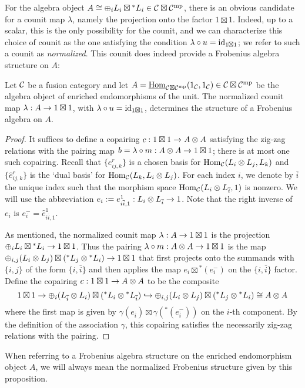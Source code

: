 \documentclass{amsart}
\begin{document}
For the algebra object $A \cong \oplus_i L_i \boxtimes {}^* L_i \in \mathcal C \boxtimes \mathcal C^{\mathrm{mp}}$, there is an obvious candidate for a counit map $\lambda$, namely the projection onto the factor $1 \boxtimes 1$.  Indeed, up to a scalar, this is the only possibility for the counit, and we can characterize this choice of counit as the one satisfying the condition $\lambda \circ u = \mathrm{id}_{1 \boxtimes 1}$; we refer to such a counit as \emph{normalized}.  This counit does indeed provide a Frobenius algebra structure on $A$:
\begin{proposition}
Let $\mathcal C$ be a fusion category and let $A = \operatorname{\underline{Hom}}_{\mathcal C \boxtimes \mathcal C^{\mathrm{mp}}}(1_\mathcal C,1_\mathcal C) \in \mathcal C \boxtimes \mathcal C^{\mathrm{mp}}$ be the algebra object of enriched endomorphisms of the unit.  The normalized counit map $\lambda: A \rightarrow 1 \boxtimes 1$, with $\lambda \circ u = \mathrm{id}_{1 \boxtimes 1}$, determines the structure of a Frobenius algebra on $A$.
\end{proposition}
\begin{proof}
It suffices to define a copairing $c : 1 \boxtimes 1 \rightarrow A \otimes A$ satisfying the zig-zag relations with the pairing map $b = \lambda \circ m : A \otimes A \rightarrow 1 \boxtimes 1$; there is at most one such copairing.  Recall that $\{e^r_{ij,k}\}$ is a chosen basis for $\operatorname{Hom}_\mathcal C(L_i \otimes L_j,L_k)$ and $\{\hat{e}^r_{ij,k}\}$ is the `dual basis' for $\operatorname{Hom}_\mathcal C(L_k,L_i \otimes L_j)$.  For each index $i$, we denote by $\overline{i}$ the unique index such that the morphism space $\operatorname{Hom}_\mathcal C(L_i \otimes L_{\overline{i}},1)$ is nonzero.  We will use the abbreviation $e_i := e^1_{i\overline{i},1} : L_i \otimes L_{\overline{i}} \rightarrow 1$.  Note that the right inverse of $e_i$ is $e_i^{-} = \hat{e}^1_{i\overline{i},1}$.

As mentioned, the normalized counit map $\lambda: A \rightarrow 1 \boxtimes 1$ is the projection $\oplus_i L_i \boxtimes {}^* L_i \rightarrow 1 \boxtimes 1$.  Thus the pairing $\lambda \circ m: A \otimes A \rightarrow 1 \boxtimes 1$ is the map $\oplus_{i,j} (L_i \otimes L_j) \boxtimes ({}^* L_j \otimes {}^* L_i) \rightarrow 1 \boxtimes 1$ that first projects onto the summands with $\{i,j\}$ of the form $\{i,\overline{i}\}$ and then applies the map $e_i \boxtimes {}^* (e_i^{-})$ on the $\{i,\overline{i}\}$ factor.  Define the copairing $c : 1 \boxtimes 1 \rightarrow A \otimes A$ to be the composite
\[
1 \boxtimes 1 \rightarrow \oplus_i (L_{\overline{i}} \otimes L_i) \boxtimes ({}^* L_i \otimes {}^* L_{\overline{i}}) \hookrightarrow \oplus_{i,j}  (L_i \otimes L_j) \boxtimes ({}^* L_j \otimes {}^* L_i) \cong A \otimes A
\]
where the first map is given by $\gamma(e_{\overline{i}}) \boxtimes \gamma({}^*(e_{\overline{i}}^{-}))$ on the $i$-th component.  By the definition of the association $\gamma$, this copairing satisfies the necessarily zig-zag relations with the pairing.
\end{proof}
\nid When referring to a Frobenius algebra structure on the enriched endomorphism object $A$, we will always mean the normalized Frobenius structure given by this proposition.
\end{document}
